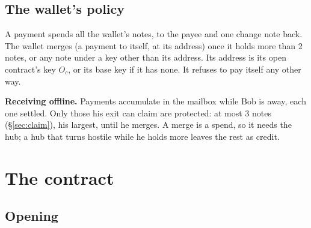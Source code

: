 \documentclass[11pt]{article}
\theoremstyle{plain}
\theoremstyle{definition}
\newcommand{\Oc}{O_c}
\begin{document}
\subsection{The wallet's policy}

A payment spends all the wallet's notes, to the payee and one change
note back. The wallet merges (a payment to itself, at its address) once
it holds more than 2 notes, or any note under a key other than its
address. Its address is its open contract's key $\Oc$, or its base key
if it has none. It refuses to pay itself any other way.

\textbf{Receiving offline.} Payments accumulate in the mailbox while
Bob is away, each one settled. Only those his exit can claim are
protected: at most 3 notes (\S\ref{sec:claim}), his largest, until he
merges. A merge is a spend, so it needs the hub; a hub that turns
hostile while he holds more leaves the rest as credit.

\section{The contract}

\subsection{Opening}\label{sec:opening}
\end{document}
